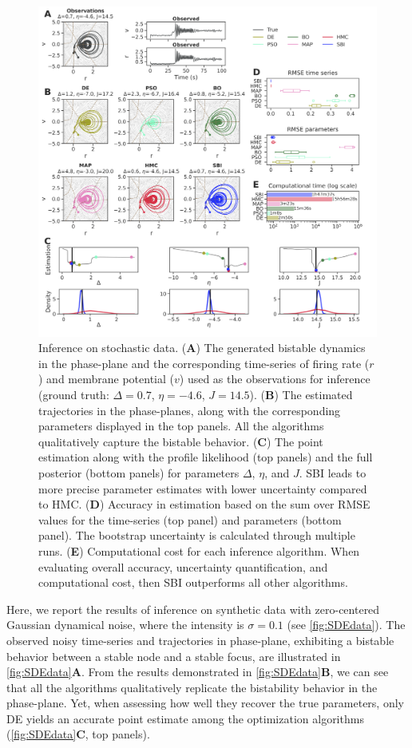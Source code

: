 \documentclass[preprint,11pt,authoryear]{elsarticle}
\begin{document}
\begin{figure}[p]
    \centering
    \includegraphics[width=\linewidth]{Figs/Fig2.png}
    \caption{Inference on stochastic data.  (\textbf{A}) The generated bistable dynamics in the phase-plane and the corresponding time-series of firing rate ($r$) and membrane potential ($v$) used as the observations for inference (ground truth: $\Delta=0.7$, $\eta=-4.6$, $J=14.5$).  (\textbf{B}) The estimated trajectories in the phase-planes, along with the corresponding parameters displayed in the top panels. All the algorithms qualitatively capture the bistable behavior. (\textbf{C}) The point estimation along with the profile likelihood (top panels) and the full posterior (bottom panels) for parameters $\Delta$, $\eta$, and $J$. SBI leads to more precise parameter estimates with lower uncertainty compared to HMC. (\textbf{D}) Accuracy in estimation based on the sum over RMSE values for the time-series (top panel) and parameters (bottom panel). The bootstrap uncertainty is calculated through multiple runs. (\textbf{E}) Computational cost for each inference algorithm.  When evaluating overall accuracy, uncertainty quantification, and computational cost, then SBI outperforms all other algorithms.
    }
    \label{fig:SDEdata}
\end{figure}


Here, we report the results of inference on synthetic data with zero-centered Gaussian dynamical noise, where the intensity is $\sigma = 0.1$  (see \autoref{fig:SDEdata}).
The observed noisy time-series and trajectories in phase-plane, exhibiting a bistable behavior between a stable node and a stable focus, are illustrated in \autoref{fig:SDEdata}\textbf{A}. From the results demonstrated in \autoref{fig:SDEdata}\textbf{B}, we can see that all the algorithms qualitatively replicate the bistability behavior in the phase-plane. Yet, when assessing how well they recover the true parameters, only DE yields an accurate point estimate among the optimization algorithms (\autoref{fig:SDEdata}\textbf{C}, top panels). 
\end{document}
